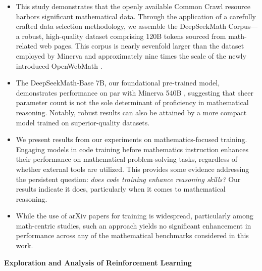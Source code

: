 \begin{itemize}[topsep=0pt]
    \item This study demonstrates that the openly available Common Crawl resource harbors significant mathematical data. Through the application of a carefully crafted data selection methodology, we assemble the DeepSeekMath Corpus—a robust, high-quality dataset comprising 120B tokens sourced from math-related web pages. This corpus is nearly sevenfold larger than the dataset employed by Minerva \citep{minerva} and approximately nine times the scale of the newly introduced OpenWebMath \citep{openwebmath}.

\item The DeepSeekMath-Base 7B, our foundational pre-trained model, demonstrates performance on par with Minerva 540B \citep{minerva}, suggesting that sheer parameter count is not the sole determinant of proficiency in mathematical reasoning. Notably, robust results can also be attained by a more compact model trained on superior-quality datasets.

\item We present results from our experiments on mathematics-focused training. Engaging models in code training before mathematics instruction enhances their performance on mathematical problem-solving tasks, regardless of whether external tools are utilized. This provides some evidence addressing the persistent question: \textit{does code training enhance reasoning skills?} Our results indicate it does, particularly when it comes to mathematical reasoning.

\item While the use of arXiv papers for training is widespread, particularly among math-centric studies, such an approach yields no significant enhancement in performance across any of the mathematical benchmarks considered in this work.
\end{itemize}

\textbf{Exploration and Analysis of Reinforcement Learning}

